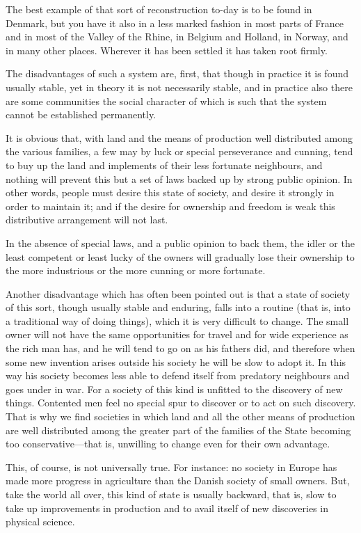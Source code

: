 \documentclass{book}
\begin{document}
The best example of that sort of reconstruction to-day is to be found in Denmark, but you have it also in a less marked fashion in most parts of France and in most of the Valley of the Rhine, in Belgium and Holland, in Norway, and in many other places. Wherever it has been settled it has taken root firmly.

The disadvantages of such a system are, first, that though in practice it is found usually stable, yet in theory it is not necessarily stable, and in practice also there are some communities the social character of which is such that the system cannot be established permanently.

It is obvious that, with land and the means of production well distributed among the various families, a few may by luck or special perseverance and cunning, tend to buy up the land and implements of their less fortunate neighbours, and nothing will prevent this but a set of laws backed up by strong public opinion. In other words, people must desire this state of society, and desire it strongly in order to maintain it; and if the desire for ownership and freedom is weak this distributive arrangement will not last.

In the absence of special laws, and a public opinion to back them, the idler or the least competent or least lucky of the owners will gradually lose their ownership to the more industrious or the more cunning or more fortunate.

Another disadvantage which has often been pointed out is that a state of society of this sort, though usually stable and enduring, falls into a routine (that is, into a traditional way of doing things), which it is very difficult to change. The small owner will not have the same opportunities for travel and for wide experience as the rich man has, and he will tend to go on as his fathers did, and therefore when some new invention arises outside his society he will be slow to adopt it. In this way his society becomes less able to defend itself from predatory neighbours and goes under in war. For a society of this kind is unfitted to the discovery of new things. Contented men feel no special spur to discover or to act on such discovery. That is why we find societies in which land and all the other means of production are well distributed among the greater part of the families of the State becoming too conservative—that is, unwilling to change even for their own advantage.

This, of course, is not universally true. For instance: no society in Europe has made more progress in agriculture than the Danish society of small owners. But, take the world all over, this kind of state is usually backward, that is, slow to take up improvements in production and to avail itself of new discoveries in physical science.
\end{document}
